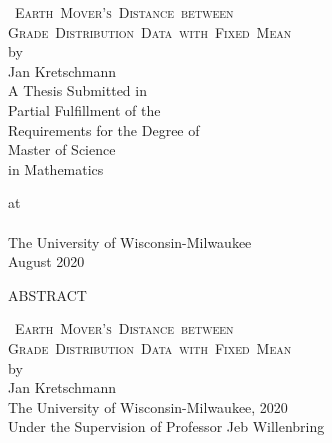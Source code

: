 \documentclass[12pt,letterpaper,oneside,openany]{book}
\newcommand{\name}{Jan Kretschmann}
\newcommand{\pglen}{390}
\newcommand{\pts}{12pt}
\newcommand{\vs}{\vspace{0.7cm}}
\newcommand{\mytitle}{\Large \textsc{\mbox{ Earth Mover's Distance between }\\
  \mbox{Grade Distribution Data with Fixed Mean}}\\[20pt] \normalsize by\\
  [20pt] \name  \\[\pts] \vs }
\begin{document}
\setlength{\baselineskip}{19pt}
\frontmatter




\doublespacing
{}

\pagestyle{plain}
\thispagestyle{empty}
\vs\vs 
\begin{center}
	\mytitle
	\singlespacing
	\vs
	A Thesis Submitted in \\
	Partial Fulfillment of the \\
	Requirements for the Degree of \\
	\vs \vs
	Master of Science  \\ %
	in 
	Mathematics 
	\vs \vs

	at\\
	 \ \\
	The University of Wisconsin-Milwaukee\\ 
	August 2020
\end{center}

\pagebreak



%

\begin{center} 
	{\large ABSTRACT} 
\end{center}
\singlespacing
\begin{center}
	\mytitle  The University of Wisconsin-Milwaukee, 2020 \\
	Under the Supervision of Professor Jeb Willenbring 
\end{center}
\end{document}
